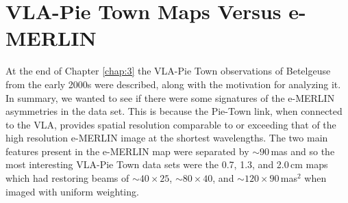 \section{VLA-Pie Town Maps Versus e-MERLIN}\label{sec:5.13}
At the end of Chapter \ref{chap:3} the VLA-Pie Town observations of Betelgeuse from the early 2000s were described, along with the motivation for analyzing it. In summary, we wanted to see if there were some signatures of the e-MERLIN asymmetries in the data set. This is because the Pie-Town link, when connected to the VLA, provides spatial resolution comparable to or exceeding that of the high resolution e-MERLIN image at the shortest wavelengths. The two main features present in the e-MERLIN map were separated by $\sim 90$\,mas and so the most interesting VLA-Pie Town data sets were the 0.7, 1.3, and 2.0\,cm maps which had restoring beams of $\sim 40 \times 25$, $\sim 80 \times 40$, and $\sim 120 \times 90$\,mas$^{2}$ when imaged with uniform weighting. 


